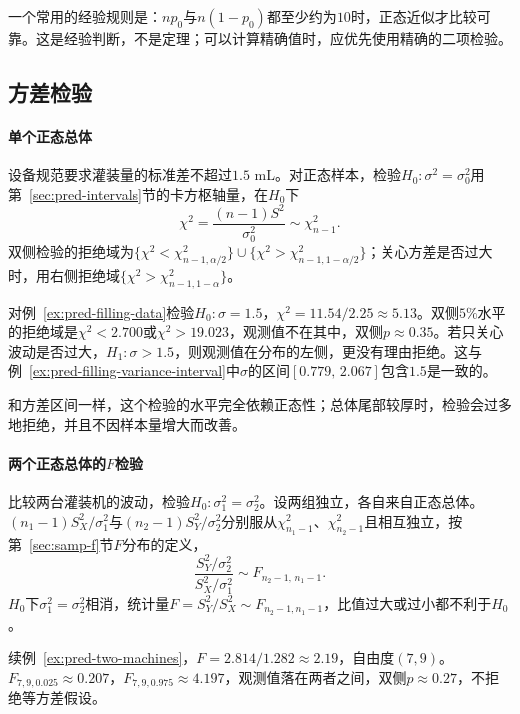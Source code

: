 一个常用的经验规则是：$np_0$与$n(1-p_0)$都至少约为$10$时，正态近似才比较可靠。这是经验判断，不是定理；可以计算精确值时，应优先使用精确的二项检验。

\subsection{方差检验}

\paragraph{单个正态总体}

设备规范要求灌装量的标准差不超过$1.5$ mL。对正态样本，检验$H_0:\sigma^2=\sigma_0^2$用第~\ref{sec:pred-intervals}节的卡方枢轴量，在$H_0$下
\[
 \chi^2=\frac{(n-1)S^2}{\sigma_0^2}\sim\chi^2_{n-1}.
\]
双侧检验的拒绝域为$\{\chi^2<\chi^2_{n-1,\alpha/2}\}\cup\{\chi^2>\chi^2_{n-1,1-\alpha/2}\}$；关心方差是否过大时，用右侧拒绝域$\{\chi^2>\chi^2_{n-1,1-\alpha}\}$。

\begin{example}[灌装量的方差检验]
\label{ex:pred-variance-test}
对例~\ref{ex:pred-filling-data}检验$H_0:\sigma=1.5$，$\chi^2=11.54/2.25\approx5.13$。双侧$5\%$水平的拒绝域是$\chi^2<2.700$或$\chi^2>19.023$，观测值不在其中，双侧$p\approx0.35$。若只关心波动是否过大，$H_1:\sigma>1.5$，则观测值在分布的左侧，更没有理由拒绝。这与例~\ref{ex:pred-filling-variance-interval}中$\sigma$的区间$[0.779,\,2.067]$包含$1.5$是一致的。
\end{example}

和方差区间一样，这个检验的水平完全依赖正态性；总体尾部较厚时，检验会过多地拒绝，并且不因样本量增大而改善。

\paragraph{两个正态总体的$F$检验}

比较两台灌装机的波动，检验$H_0:\sigma_1^2=\sigma_2^2$。设两组独立，各自来自正态总体。$(n_1-1)S_X^2/\sigma_1^2$与$(n_2-1)S_Y^2/\sigma_2^2$分别服从$\chi^2_{n_1-1}$、$\chi^2_{n_2-1}$且相互独立，按第~\ref{sec:samp-f}节$F$分布的定义，
\[
 \frac{S_Y^2/\sigma_2^2}{S_X^2/\sigma_1^2}\sim F_{n_2-1,\,n_1-1}.
\]
$H_0$下$\sigma_1^2=\sigma_2^2$相消，统计量$F=S_Y^2/S_X^2\sim F_{n_2-1,n_1-1}$，比值过大或过小都不利于$H_0$。

\begin{example}[两台灌装机的方差比较]
\label{ex:pred-f-test}
续例~\ref{ex:pred-two-machines}，$F=2.814/1.282\approx2.19$，自由度$(7,9)$。$F_{7,9,0.025}\approx0.207$，$F_{7,9,0.975}\approx4.197$，观测值落在两者之间，双侧$p\approx0.27$，不拒绝等方差假设。
\end{example}

